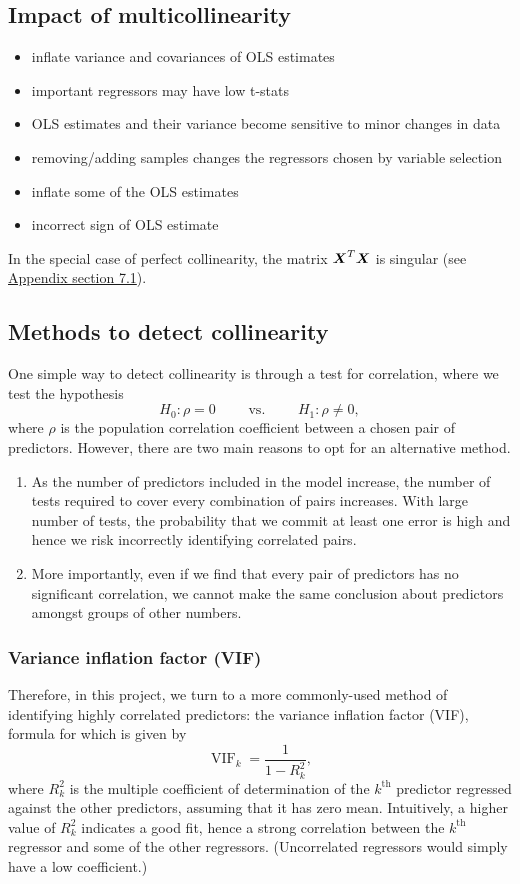 \documentclass[12pt]{article}
\DeclareMathOperator{\vif}{VIF}
\begin{document}
	\subsection{Impact of multicollinearity}
	\begin{itemize}
		\item inflate variance and covariances of OLS estimates 
		\item important regressors may have low t-stats 
		\item  OLS estimates and their variance become sensitive to minor changes in data
		\item removing/adding samples changes the regressors chosen by variable selection
		\item  inflate some of the OLS estimates
		\item  incorrect sign of OLS estimate
	\end{itemize}
	
	In the special case of perfect collinearity, the matrix $\boldsymbol{X}^T\boldsymbol{X}$ is singular (see \hyperref[sec:append1]{Appendix section 7.1}).
	
	\subsection{Methods to detect collinearity}
	
	One simple way to detect collinearity is through a test for correlation, where we test the hypothesis
	$$H_0: \rho=0 \quad\quad\text{ vs. }\quad\quad H_1: \rho\neq 0,$$
	where $\rho$ is the population correlation coefficient between a chosen pair of predictors. However, there are two main reasons to opt for an alternative method.
	\begin{enumerate}
		\item As the number of predictors included in the model increase, the number of tests required to cover every combination of pairs increases. With large number of tests, the probability that we commit at least one error is high and hence we risk incorrectly identifying correlated pairs. 
		\item More importantly, even if we find that every pair of predictors has no significant correlation, we cannot make the same conclusion about predictors amongst groups of other numbers. 
	\end{enumerate}
	
	\subsubsection{Variance inflation factor (VIF)}
	Therefore, in this project, we turn to a more commonly-used method of identifying highly correlated predictors: the variance inflation factor (VIF), formula for which is given by
	$$\vif_k=\frac{1}{1-R_{k}^2},$$
	where $R^2_k$ is the multiple coefficient of determination of the $k^{\text{th}}$ predictor regressed against the other predictors, assuming that it has zero mean. Intuitively, a higher value of $R^2_k$ indicates a good fit, hence a strong correlation between the $k^{\text{th}}$ regressor and some of the other regressors. (Uncorrelated regressors would simply have a low coefficient.) \\
	
\end{document}
